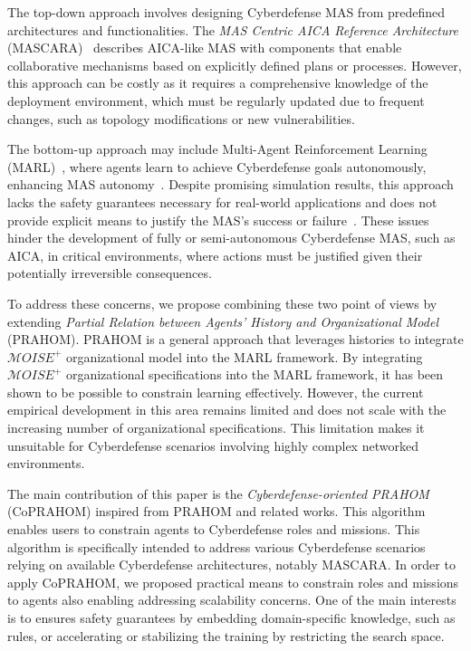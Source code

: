 \documentclass[conference]{IEEEtran}
\begin{document}
The top-down approach involves designing Cyberdefense MAS from predefined architectures and functionalities. The \textit{MAS Centric AICA Reference Architecture} (MASCARA)~\cite{Kott2023} describes AICA-like MAS with components that enable collaborative mechanisms based on explicitly defined plans or processes. However, this approach can be costly as it requires a comprehensive knowledge of the deployment environment, which must be regularly updated due to frequent changes, such as topology modifications or new vulnerabilities.

The bottom-up approach may include Multi-Agent Reinforcement Learning (MARL)~\cite{Albrecht2024}, where agents learn to achieve Cyberdefense goals autonomously, enhancing MAS autonomy~\cite{hammar_stadle4_noms_23}. Despite promising simulation results, this approach lacks the safety guarantees necessary for real-world applications and does not provide explicit means to justify the MAS's success or failure~\cite{dulacarnold2019}. These issues hinder the development of fully or semi-autonomous Cyberdefense MAS, such as AICA, in critical environments, where actions must be justified given their potentially irreversible consequences.

To address these concerns, we propose combining these two point of views by extending \textit{Partial Relation between Agents' History and Organizational Model}~\cite{soule2024} (PRAHOM). PRAHOM is a general approach that leverages histories to integrate $\mathcal{M}OISE^+$ organizational model into the MARL framework. By integrating $\mathcal{M}OISE^+$ organizational specifications into the MARL framework, it has been shown to be possible to constrain learning effectively. However, the current empirical development in this area remains limited and does not scale with the increasing number of organizational specifications. This limitation makes it unsuitable for Cyberdefense scenarios involving highly complex networked environments.

The main contribution of this paper is the \textit{Cyberdefense-oriented PRAHOM} (CoPRAHOM) inspired from PRAHOM and related works. This algorithm enables users to constrain agents to Cyberdefense roles and missions. This algorithm is specifically intended to address various Cyberdefense scenarios relying on available Cyberdefense architectures, notably MASCARA. In order to apply CoPRAHOM, we proposed practical means to constrain roles and missions to agents also enabling addressing scalability concerns. One of the main interests is to ensures safety guarantees by embedding domain-specific knowledge, such as rules, or accelerating or stabilizing the training by restricting the search space.
\end{document}
